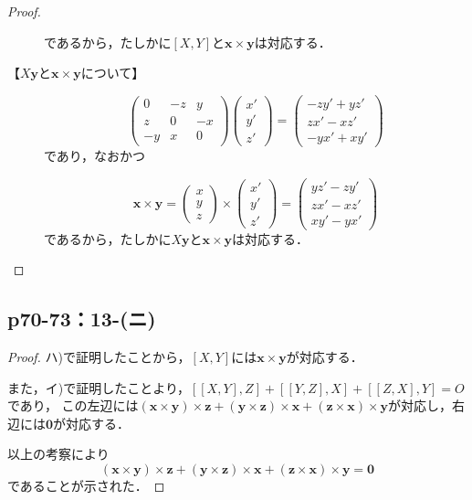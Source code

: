 \documentclass[a4paper,10pt,fleqn]{ltjsarticle}
\begin{document}
\begin{leftbar}
\begin{proof}
\begin{description}
\[                  \]
                  であるから，たしかに$[X,Y]$と$\bm{x} \times \bm{y}$は対応する．
            \item[【$X\bm{y}$と$\bm{x}\times\bm{y}$について】]
                  \[
                      \begin{pmatrix} 0 & -z & y \\ z & 0 & -x \\ -y & x & 0 \end{pmatrix} \begin{pmatrix} x' \\ y' \\ z' \end{pmatrix} = \begin{pmatrix} -zy'+yz' \\ zx'-xz' \\ -yx'+xy' \end{pmatrix}
                  \]
                  であり，なおかつ

                  \[
                      \bm{x}\times \bm{y} = \begin{pmatrix} x \\ y \\ z \end{pmatrix} \times \begin{pmatrix} x' \\ y ' \\ z' \end{pmatrix} = \begin{pmatrix} yz'-zy' \\ zx'-xz' \\ xy'-yx' \end{pmatrix}
                  \]
                  であるから，たしかに$X\bm{y}$と$\bm{x} \times \bm{y}$は対応する．
        \end{description}
    \end{proof}
\end{leftbar}


\newpage

\subsection*{p70-73：13-(ニ)}
\begin{tleftbar}
    \begin{proof}
        ハ)で証明したことから，$[X,Y]$には$\bm{x} \times \bm{y}$が対応する．

        また，イ)で証明したことより，$[[X,Y],Z] +[[Y,Z],X]+[[Z,X],Y]=O$であり，
        この左辺には$(\bm{x}\times\bm{y}) \times \bm{z} + (\bm{y}\times\bm{z}) \times \bm{x} + (\bm{z}\times\bm{x}) \times \bm{y}$が対応し，右辺には$\bm{0}$が対応する．

        以上の考察により
        \[
            (\bm{x}\times\bm{y}) \times \bm{z} + (\bm{y}\times\bm{z}) \times \bm{x} + (\bm{z}\times\bm{x}) \times \bm{y} =\bm{0}
        \]
        であることが示された．
    \end{proof}
\end{tleftbar}
\end{document}
